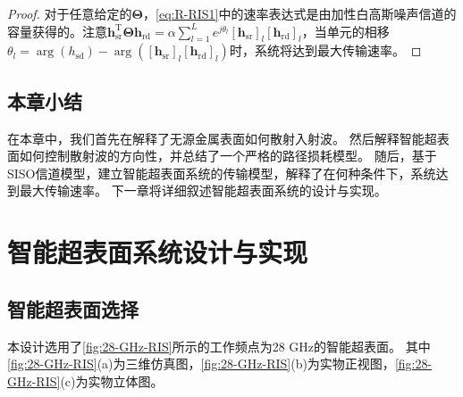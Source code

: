 \documentclass[supercite]{HustGraduPaper}
\begin{document}
\begin{proof}
	对于任意给定的$\boldsymbol{\Theta}$，\autoref{eq:R-RIS1}中的速率表达式是由加性白高斯噪声信道的容量获得的。注意$ \mathbf{h}_{\mathrm{sr}}^{\mathrm{T}} \boldsymbol{\Theta} \mathbf{h}_{\mathrm{rd}} = \alpha \sum_{l=1}^{L} e^{j\theta_l} \left[\mathbf{h}_{\mathrm{sr}}\right]_{l}\left[\mathbf{h}_{\mathrm{rd}}\right]_{l} $，当单元的相移$\theta_{l}=\arg \left(h_{\mathrm{sd}}\right)-\arg \left(\left[\mathbf{h}_{\mathrm{sr}}\right]_{l}\left[\mathbf{h}_{\mathrm{rd}}\right]_{l}\right)$时，系统将达到最大传输速率。
\end{proof}

\subsection{本章小结}

在本章中，我们首先在解释了无源金属表面如何散射入射波。
然后解释智能超表面如何控制散射波的方向性，并总结了一个严格的路径损耗模型。
随后，基于SISO信道模型，建立智能超表面系统的传输模型，解释了在何种条件下，系统达到最大传输速率。
下一章将详细叙述智能超表面系统的设计与实现。

\section{智能超表面系统设计与实现}\label{sec:design}

\subsection{智能超表面选择}\label{subsec:28-GHz-RIS}

本设计选用了\autoref{fig:28-GHz-RIS}所示的工作频点为28 GHz的智能超表面。
其中\autoref{fig:28-GHz-RIS}(a)为三维仿真图，\autoref{fig:28-GHz-RIS}(b)为实物正视图，\autoref{fig:28-GHz-RIS}(c)为实物立体图。
\end{document}
